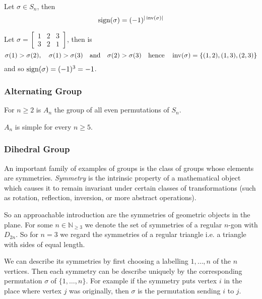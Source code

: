 \begin{proposition}
   Let \(\sigma \in S_n\), then
   \[\operatorname{sign}(\sigma) = (-1)^{|\operatorname{inv}(\sigma)|}\]
\end{proposition}
\begin{example}
   Let \(\sigma = \begin{bmatrix} 1 & 2 & 3\\ 3 & 2 & 1\end{bmatrix}\), then is
   \[\sigma(1) > \sigma(2),\quad \sigma(1) > \sigma(3) \quad\text{and}\quad \sigma(2) > \sigma(3) \quad\text{hence}\quad \operatorname{inv}(\sigma) = \{(1,2), (1, 3), (2, 3)\}\]
   and so \(\operatorname{sign}(\sigma) = (-1)^3 = -1\).
\end{example}

\subsubsection{Alternating Group}
\begin{definition}
   For \(n \geq 2\) is \(A_n\) the group of all even permutations of \(S_n\).
\end{definition}

\begin{proposition}
   \(A_n\) is simple for every \(n \geq 5\).
\end{proposition}

\subsubsection{Dihedral Group}\label{ssec:dihedral_groups}
An important family of examples of groups is the class of groups whose elements are symmetries.
\emph{Symmetry} is the intrinsic property of a mathematical object which causes it to remain invariant under certain classes of transformations (such as rotation, reflection, inversion, or more abstract operations).

So an approachable introduction are the symmetries of geometric objects in the plane.
For some \(n \in \mathbb{N}_{\geq 3}\) we denote the set of symmetries of a regular \(n\)-gon with \(D_{2n}\).
So for \(n=3\) we regard the symmetries of a regular triangle i.e. a triangle with sides of equal length.

We can describe its symmetries by first choosing a labelling \(1, \ldots, n\) of the \(n\) vertices.
Then each symmetry can be describe uniquely by the corresponding permutation \(\sigma\) of \(\{1, \ldots, n\}\).
For example if the symmetry puts vertex \(i\) in the place where vertex \(j\) was originally, then \(\sigma\) is the permutation sending \(i\) to \(j\).


